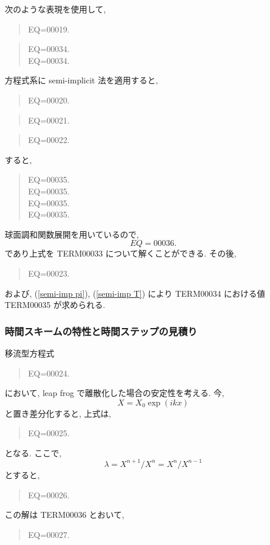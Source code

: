 次のような表現を使用して,
%
\begin{quote}
EQ=00019.
\label{せみいんぷ}
\end{quote}
%
\begin{quote}
\nonumber
EQ=00034.\\
EQ=00034.
\end{quote}
%
方程式系に semi-implicit 法を適用すると,
%
\begin{quote}
EQ=00020.
\label{semi-imp pi}
\end{quote}
%
\begin{quote}
EQ=00021.
\label{semi-imp D}
\end{quote}
%
\begin{quote}
EQ=00022.
\label{semi-imp T}
\end{quote}


すると, 
%
\begin{quote}
\label{semi-imp barD}
\nonumber
EQ=00035.\\
\nonumber
EQ=00035.\\
\nonumber
EQ=00035.\\
EQ=00035.
\end{quote}

球面調和関数展開を用いているので,
\[
EQ=00036.
\]
であり上式を TERM00033 について解くことができる.
%
その後,
%
\begin{quote}
EQ=00023.
\end{quote}
%
および, (\ref{semi-imp pi}), (\ref{semi-imp T})
により TERM00034 における値 TERM00035
が求められる.

\subsubsection{時間スキームの特性と時間ステップの見積り}

移流型方程式 
\begin{quote}
EQ=00024.
\end{quote}
において,  leap frog で離散化した場合の安定性を考える.
今, 
\begin{displaymath}
  X = X_0 \exp(ikx)
\end{displaymath}
と置き差分化すると, 上式は,
\begin{quote}
EQ=00025.
\end{quote}
となる.
ここで,
\begin{displaymath}
  \lambda = X^{n+1}/X^n = X^n/X^{n-1} 
\end{displaymath}
とすると,
\begin{quote}
EQ=00026.
\end{quote}
この解は TERM00036 とおいて,
\begin{quote}
EQ=00027.
\end{quote}

